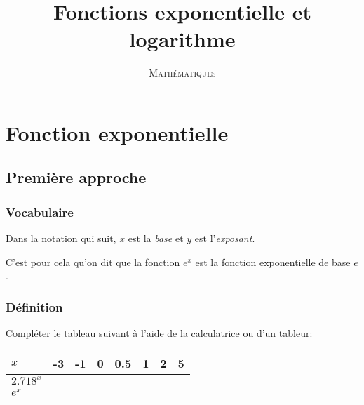 \documentclass[a4paper,12pt]{scrartcl}
\date{}
\title{Fonctions exponentielle et logarithme}
\author{\textsc{Mathématiques}}
\begin{document}
\maketitle

\tableofcontents
  
\section{Fonction exponentielle}

\subsection{Première approche}

\subsubsection{Vocabulaire}


Dans la notation qui suit, $x$ est la \emph{base} et $y$ est l'\emph{exposant}.

\begin{center}
\end{center}

C'est pour cela qu'on dit que la fonction $e^x$ est la fonction exponentielle de base $e$.

\subsubsection{Définition}

Compléter le tableau suivant à l'aide de la calculatrice ou d'un tableur:

\begin{center}
\begin{tabular}{|l|l|l|l|l|l|l|l|}
\hline
$x$       & -3 & -1 & 0 & 0.5 & 1 & 2 & 5 \\ \hline
$2.718^x$ &  \hspace{3em}  &  \hspace{3em}  & \hspace{3em}  &  \hspace{3em}   & \hspace{3em}  & \hspace{3em}  & \hspace{3em}  \\ \hline
$e^x$       &    &    &   &     &   &   &   \\ \hline
\end{tabular}
\end{center}
\end{document}
